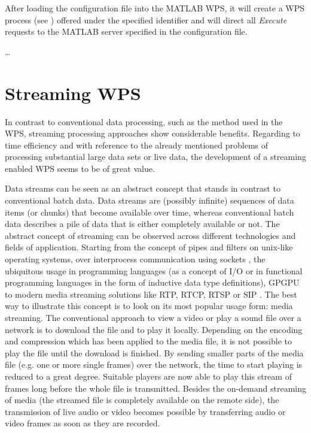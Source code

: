 		After loading the configuration file into the MATLAB WPS, it will create a WPS process (see ) offered under the specified identifier and will direct all \emph{Execute} requests to the MATLAB server specified in the configuration file.

		\dots

\chapter{Streaming WPS}
	In contrast to conventional data processing, such as the method used in the \ac{WPS}, streaming processing approaches show considerable benefits. Regarding to time efficiency and with reference to the already mentioned problems of processing substantial large data sets or live data, the development of a streaming enabled \ac{WPS} seems to be of great value.

	Data streams can be seen as an abstract concept that stands in contrast to conventional batch data. Data streams are (possibly infinite) sequences of data items (or chunks) that become available over time, whereas conventional batch data describes a pile of data that is either completely available or not. The abstract concept of streaming can be observed across different technologies and fields of application. Starting from the concept of pipes and filters on unix-like operating systems, over interprocess communication using sockets \citep[either local or over a network,][]{buschmann1996pattern}, the ubiquitous usage in programming languages (as a concept of I/O or in functional programming languages in the form of inductive data type definitions), \ac{GPGPU} to modern media streaming solutions like RTP, RTCP, RTSP \citep{ietf:rfc3550,ietf:rfc2326} or SIP \citep{ietf:rfc3261}. The best way to illustrate this concept is to look on its most popular usage form: media streaming. The conventional approach to view a video or play a sound file over a network is to download the file and to play it locally. Depending on the encoding and compression which has been applied to the media file, it is not possible to play the file until the download is finished. By sending smaller parts of the media file (e.g. one or more single frames) over the network, the time to start playing is reduced to a great degree. Suitable players are now able to play this stream of frames long before the whole file is transmitted. Besides the on-demand streaming of media (the streamed file is completely available on the remote side), the transmission of live audio or video becomes possible by transferring audio or video frames as soon as they are recorded.

